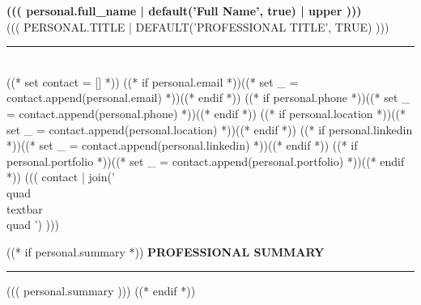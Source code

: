 \documentclass[11pt,a4paper]{article}
\newcommand{\redsection}[1]{%
  \vspace{9pt}
  {\fontsize{11}{13}\selectfont\bfseries\color{deepred}\MakeUppercase{#1}}\\[-1pt]
  {\color{deepred}\rule{\linewidth}{0.5pt}}
  \vspace{6pt}
}
\begin{document}
\noindent
{}

\begin{center}
  {\fontsize{30}{36}\selectfont\bfseries\color{deepred} ((( personal.full_name | default('Full Name', true) | upper )))}\\[8pt]
  {\fontsize{10}{12}\selectfont\color{muted}\MakeUppercase{((( personal.title | default('Professional Title', true) )))}}\\[10pt]
  {\color{light}\rule{0.5\textwidth}{0.3pt}}\\[8pt]
  {\fontsize{8}{10}\selectfont\color{muted}
    ((* set contact = [] *))
    ((* if personal.email *))((* set _ = contact.append(personal.email) *))((* endif *))
    ((* if personal.phone *))((* set _ = contact.append(personal.phone) *))((* endif *))
    ((* if personal.location *))((* set _ = contact.append(personal.location) *))((* endif *))
    ((* if personal.linkedin *))((* set _ = contact.append(personal.linkedin) *))((* endif *))
    ((* if personal.portfolio *))((* set _ = contact.append(personal.portfolio) *))((* endif *))
    ((( contact | join(' \\quad\\textbar\\quad ') )))
  }
\end{center}

((* if personal.summary *))
\redsection{Professional Summary}
{\small ((( personal.summary )))}
((* endif *))
\end{document}
